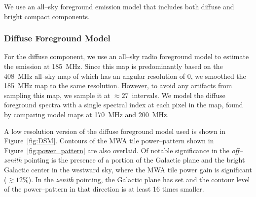 \documentclass[preprint2,iop,numberedappendix]{emulateapj}
\begin{document}

We use an all--sky foreground emission model that includes both diffuse and bright compact components.  

\subsubsection{Diffuse Foreground Model}\label{sec:DSM}

For the diffuse component, we use an all--sky radio foreground model \citep{deo08} to estimate the emission at 185~MHz. Since this map is predominantly based on the 408~MHz all--sky map of \citet{has82} which has an angular resolution of 0, we smoothed the 185~MHz map to the same resolution. However, to avoid any artifacts from sampling this map, we sample it at $\approx 27$\arcmin~intervals. We model the diffuse foreground spectra with a single spectral index at each pixel in the map, found by comparing model maps at 170~MHz and 200~MHz.

A low resolution version of the diffuse foreground model used is shown in Figure~\ref{fig:DSM}. Contours of the MWA tile power--pattern shown in Figure~\ref{fig:power_pattern} are also overlaid. Of notable significance in the {\it off--zenith} pointing is the presence of a portion of the Galactic plane and the bright Galactic center in the westward sky, where the MWA tile power gain is significant ($\gtrsim 12$\%). In the {\it zenith} pointing, the Galactic plane has set and the contour level of the power--pattern in that direction is at least 16 times smaller. 
\end{document}
